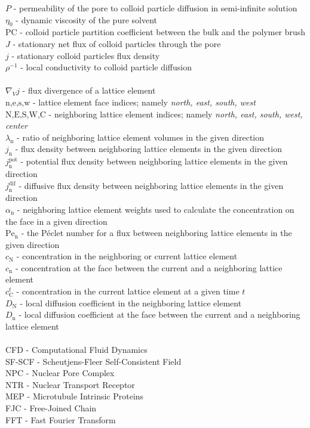 \documentclass[12pt, a4paper]{article}
\begin{document}
$P$ - permeability of the pore to colloid particle diffusion in semi-infinite solution \\
$\eta_{0}$ - dynamic viscosity of the pure solvent \\
$\textrm{PC}$ - colloid particle partition coefficient between the bulk and the polymer brush \\
$J$ - stationary net flux of colloid particles through the pore \\
$j$ - stationary colloid particles flux density \\
$\rho^{-1}$ - local conductivity to colloid particle diffusion \\
\\
$\nabla_{V} j$ - flux divergence of a lattice element \\
$\textrm{n,e,s,w}$ - lattice element face indices; namely \textit{north, east, south, west} \\
$\textrm{N,E,S,W,C}$ - neighboring lattice element indices; namely \textit{north, east, south, west, center} \\
$\lambda_{\textrm{n}}$ - ratio of neighboring lattice element volumes in the given direction \\
$j_{\textrm{n}}$ - flux density between neighboring lattice elements in the given direction \\
$j^{\textrm{pot}}_{\textrm{n}}$ - potential flux density between neighboring lattice elements in the given direction \\
$j^{\textrm{dif}}_{\textrm{n}}$ - diffusive flux density between neighboring lattice elements in the given direction \\
$\alpha_{\textrm{n}}$ - neighboring lattice element weights used to calculate the concentration on the face in a given direction \\
$\textrm{Pe}_{\textrm{n}}$ - the Péclet number for a flux between neighboring lattice elements in the given direction \\
$c_{\textrm{N}}$ - concentration in the neighboring or current lattice element \\
$c_{\textrm{n}}$ - concentration at the face between the current and a neighboring lattice element \\ 
$c^{t}_{\textrm{C}}$ - concentration in the current lattice element at a given time $t$ \\ 
$D_{\textrm{N}}$ - local diffusion coefficient in the neighboring lattice element \\
$D_{\textrm{n}}$ - local diffusion coefficient at the face between the current and a neighboring lattice element \\
\\
CFD - Computational Fluid Dynamics \\
SF-SCF - Scheutjens-Fleer Self-Consistent Field \\
NPC - Nuclear Pore Complex \\
NTR - Nuclear Transport Receptor \\
MEP - Microtubule Intrinsic Proteins \\
FJC - Free-Joined Chain \\
FFT - Fast Fourier Transform \\
\end{document}
